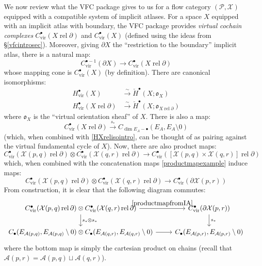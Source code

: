 \documentclass[12pt]{article}
\theoremstyle{definition}
\theoremstyle{remark}
\numberwithin{equation}{subsection}
\newcommand{\oo}{\mathfrak o}
\newcommand{\X}{\mathcal X}
\newcommand{\PPP}{\mathcal P}
\newcommand{\A}{\mathcal A}
\newcommand{\cH}{\check H}
\newcommand{\vir}{\mathrm{vir}}
\newcommand{\rel}{\operatorname{rel}}
\begin{document}
We now review what the VFC package gives to us for a flow category $(\PPP,\X)$ equipped with a compatible system of implicit atlases.  For a space $X$ equipped with an implicit atlas with boundary, the VFC package provides \emph{virtual cochain complexes} $C^\bullet_\vir(X\rel\partial)$ and $C^\bullet_\vir(X)$ (defined using the ideas from \S\ref{vfcintrosec}).  Moreover, giving $\partial X$ the ``restriction to the boundary'' implicit atlas, there is a natural map:
\begin{equation}\label{introcoboundary}
C_\vir^{\bullet-1}(\partial X)\to C_\vir^\bullet(X\rel\partial)
\end{equation}
whose mapping cone is $C^\bullet_\vir(X)$ (by definition).  There are canonical isomorphisms:
\begin{align}
\label{HXisointro}H^\bullet_\vir(X)&\xrightarrow\sim\cH^\bullet(X;\oo_X)\\
\label{HXrelisointro}H^\bullet_\vir(X\rel\partial)&\xrightarrow\sim\cH^\bullet(X;\oo_{X\rel\partial})
\end{align}
where $\oo_X$ is the ``virtual orientation sheaf'' of $X$.  There is also a map:
\begin{equation}\label{thomintro}
C^\bullet_\vir(X\rel\partial)\xrightarrow{s_\ast}C_{\dim E_A-\bullet}(E_A,E_A\setminus 0)
\end{equation}
(which, when combined with \eqref{HXrelisointro}, can be thought of as pairing against the virtual fundamental cycle of $X$).  Now, there are also product maps:
\begin{equation}
C_\vir^\bullet(\X(p,q)\rel\partial)\otimes C_\vir^\bullet(\X(q,r)\rel\partial)\to C_\vir^\bullet([\X(p,q)\times\X(q,r)]\rel\partial)
\end{equation}
which, when combined with the concatenation maps \eqref{productmapexample} induce maps:
\begin{equation}\label{productmapfromIA}
C_\vir^\bullet(\X(p,q)\rel\partial)\otimes C_\vir^\bullet(\X(q,r)\rel\partial)\to C_\vir^\bullet(\partial\X(p,r))
\end{equation}
From construction, it is clear that the following diagram commutes:
\begin{equation}\label{productofVCandonEcompare}
\begin{tikzcd}
C_\vir^\bullet(\X(p,q)\rel\partial)\otimes C_\vir^\bullet(\X(q,r)\rel\partial)\ar{r}{\eqref{productmapfromIA}}\ar{d}{s_\ast\otimes s_\ast}&C_\vir^\bullet(\partial\X(p,r))\ar{d}{s_\ast}\\
C_\bullet(E_{\A(p,q)},E_{\A(p,q)}\setminus 0)\otimes C_\bullet(E_{\A(q,r)},E_{\A(q,r)}\setminus 0)\ar{r}&C_\bullet(E_{\A(p,r)},E_{\A(p,r)}\setminus 0)
\end{tikzcd}
\end{equation}
where the bottom map is simply the cartesian product on chains (recall that $\A(p,r)=\A(p,q)\sqcup\A(q,r)$).
\end{document}
